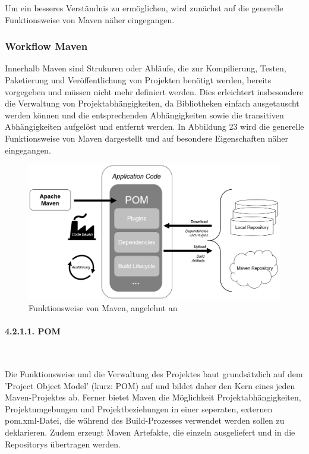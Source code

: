 Um ein besseres Verständnis zu ermöglichen, wird zunächst auf die generelle Funktionsweise von Maven näher eingegangen.

\subsubsection{Workflow Maven}
Innerhalb Maven sind Strukuren oder Abläufe, die zur Kompilierung, Testen, Paketierung und Veröffentlichung von Projekten benötigt werden, bereits vorgegeben und müssen nicht mehr definiert werden. \cite[S. 27]{spiller_maven_2011} Dies erleichtert insbesondere die Verwaltung von Projektabhängigkeiten, da Bibliotheken einfach ausgetauscht werden können und die entsprechenden Abhängigkeiten sowie die transitiven Abhängigkeiten aufgelöst und entfernt werden. In Abbildung 23 wird die generelle Funktionsweise von Maven dargestellt und auf besondere Eigenschaften näher eingegangen. 

\begin{figure}[h]
    \centering
    \includegraphics[scale=0.5]{Bilder/Workflow_Maven.png}
    \caption{Funktionsweise von Maven, angelehnt an \cite{guntur_understanding_2020}}
\end{figure}

\paragraph{4.2.1.1. POM} $~$
 
Die Funktionsweise und die Verwaltung des Projektes baut grundsätzlich auf dem 'Project Object Model' (kurz: POM) auf und bildet daher den Kern eines jeden Maven-Projektes ab. Ferner bietet Maven die Möglichkeit Projektabhängigkeiten, Projektumgebungen und Projektbeziehungen in einer seperaten, externen pom.xml-Datei, die während des Build-Prozesses verwendet werden sollen zu deklarieren. \cite[S. 3]{varanasi_introducing_2019}\cite{the_apache_software_foundation_maven_2002} Zudem erzeugt Maven Artefakte, die einzeln ausgeliefert und in die Repositorys übertragen werden. \cite[S. 29]{spiller_maven_2011}

